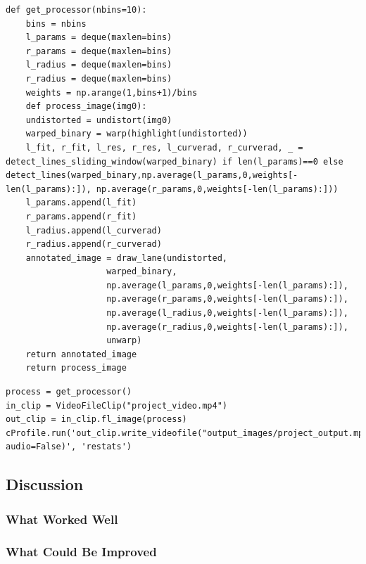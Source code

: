 \documentclass[11pt]{article}
\begin{document}
\begin{verbatim}
def get_processor(nbins=10):
    bins = nbins
    l_params = deque(maxlen=bins)
    r_params = deque(maxlen=bins)
    l_radius = deque(maxlen=bins)
    r_radius = deque(maxlen=bins)
    weights = np.arange(1,bins+1)/bins
    def process_image(img0):
	undistorted = undistort(img0)
	warped_binary = warp(highlight(undistorted))
	l_fit, r_fit, l_res, r_res, l_curverad, r_curverad, _ = detect_lines_sliding_window(warped_binary) if len(l_params)==0 else detect_lines(warped_binary,np.average(l_params,0,weights[-len(l_params):]), np.average(r_params,0,weights[-len(l_params):]))
	l_params.append(l_fit)
	r_params.append(r_fit)
	l_radius.append(l_curverad)
	r_radius.append(r_curverad)
	annotated_image = draw_lane(undistorted,
				    warped_binary,
				    np.average(l_params,0,weights[-len(l_params):]),
				    np.average(r_params,0,weights[-len(l_params):]),
				    np.average(l_radius,0,weights[-len(l_params):]),
				    np.average(r_radius,0,weights[-len(l_params):]),
				    unwarp)
	return annotated_image
    return process_image
\end{verbatim}

\begin{verbatim}
process = get_processor()
in_clip = VideoFileClip("project_video.mp4")
out_clip = in_clip.fl_image(process)
cProfile.run('out_clip.write_videofile("output_images/project_output.mp4", audio=False)', 'restats')
\end{verbatim}

\subsection*{Discussion}
\label{sec-2-4}

\subsubsection*{What Worked Well}
\label{sec-2-4-1}

\subsubsection*{What Could Be Improved}
\label{sec-2-4-2}
\end{document}
